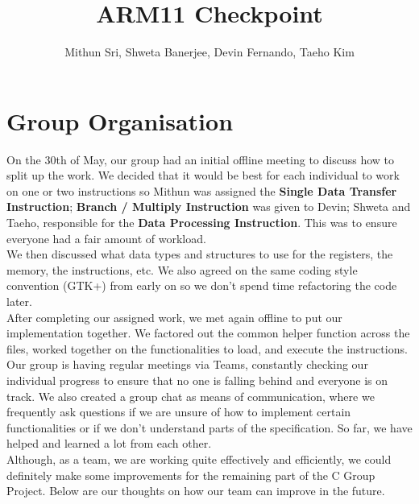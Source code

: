 \documentclass[11pt]{article}
\begin{document}
\title{ARM11 Checkpoint}
\author{Mithun Sri, Shweta Banerjee, Devin Fernando, Taeho Kim}

\maketitle

\section{Group Organisation}


\-\hspace{1cm}On the 30th of May, our group had an initial offline meeting to discuss how to split up the work. We decided that it would be best for each individual to work on one or two instructions so Mithun was assigned the {\bf Single Data Transfer Instruction}; {\bf Branch / Multiply Instruction} was given to Devin; Shweta and Taeho, responsible for the {\bf Data Processing Instruction}. This was to ensure everyone had a fair amount of workload. \\
\-\hspace{1cm}We then discussed what data types and structures to use for the registers, the memory, the instructions, etc. We also agreed on the same coding style convention (GTK+) from early on so we don't spend time refactoring the code later. \\
\-\hspace{1cm}After completing our assigned work, we met again offline to put our implementation together. We factored out the common helper function across the files, worked together on the functionalities to load, and execute the instructions. \\
\-\hspace{1cm}Our group is having regular meetings via Teams, constantly checking our individual progress to ensure that no one is falling behind and everyone is on track. We also created a group chat as means of communication, where we frequently ask questions if we are unsure of how to implement certain functionalities or if we don't understand parts of the specification. So far, we have helped and learned a lot from each other.\\ 
\-\hspace{1cm}Although, as a team, we are working quite effectively and efficiently, we could definitely make some improvements for the remaining part of the C Group Project. Below are our thoughts on how our team can improve in the future.
\end{document}
